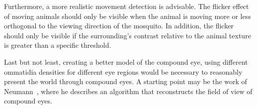 \documentclass{sig-alternate-05-2015}
\begin{document}

Furthermore, a more realistic movement detection is advisable. The flicker effect of moving animals should only be visible when the animal is moving more or less orthogonal to the viewing direction of the mosquito. In addition, the flicker should only be visible if the surrounding's contrast relative to the animal texture is greater than a specific threshold.

Last but not least, creating a better model of the compound eye, using different ommatidia densities for different eye regions would be necessary to reasonably present the world through compound eyes. A starting point may be the work of Neumann~\cite{neumann2002}, where he describes an algorithm that reconstructs the field of view of compound eyes.



  
\end{document}

